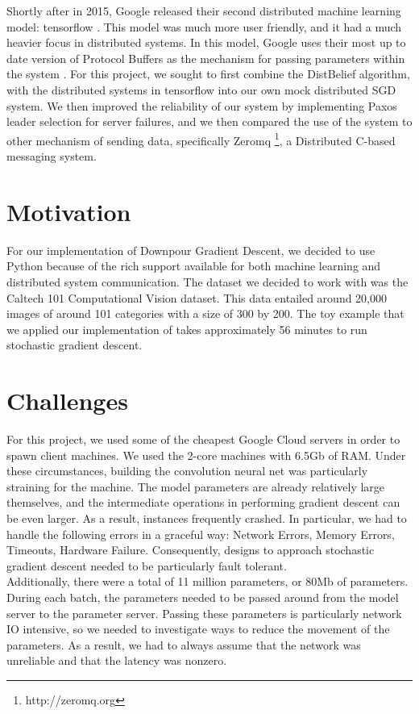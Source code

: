 \documentclass[11pt]{article}
\begin{document}
\noindent Shortly after in 2015, Google released their second distributed machine learning model: tensorflow \cite{tensorflow}. This model was much more user friendly, and it had a much heavier focus in distributed systems. In this model, Google uses their most up to date version of Protocol Buffers as the mechanism for passing parameters within the system \cite{protobuf}. For this project, we sought to first combine the DistBelief algorithm, with the distributed systems in tensorflow into our own mock distributed SGD system. We then improved the reliability of our system by implementing Paxos leader selection for server failures, and we then compared the use of the system to other mechanism of sending data, specifically Zeromq \footnote{http://zeromq.org}, a Distributed C-based messaging system. 


\section{Motivation}

For our implementation of Downpour Gradient Descent, we decided to use Python because of the rich support available for both machine learning and distributed system communication. The dataset we decided to work with was the Caltech 101 Computational Vision dataset. This data entailed around 20,000 images of around 101 categories with a size of 300 by 200. The toy example that we applied our implementation of takes approximately 56 minutes to run stochastic gradient descent.

\section{Challenges}

\noindent For this project, we used some of the cheapest Google Cloud servers in order to spawn client machines. We used the 2-core machines with 6.5Gb of RAM. Under these circumstances, building the convolution neural net was particularly straining for the machine. The model parameters are already relatively large themselves, and the intermediate operations in performing gradient descent can be even larger. As a result, instances frequently crashed. In particular, we had to handle the following errors in a graceful way: Network Errors, Memory Errors, Timeouts, Hardware Failure. Consequently, designs to approach stochastic gradient descent needed to be particularly fault tolerant.\\

\noindent Additionally, there were a total of 11 million parameters, or 80Mb of parameters. During each batch, the parameters needed to be passed around from the model server to the parameter server. Passing these parameters is particularly network IO intensive, so we needed to investigate ways to reduce the movement of the parameters. As a result, we had to always assume that the network was unreliable and that the latency was nonzero.\\
\end{document}
